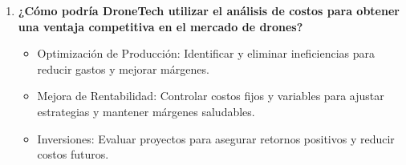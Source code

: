 \documentclass[letterpaper,12pt]{article}
\begin{document}
\begin{sloppypar}
\begin{enumerate}
    \item \textbf{¿Cómo podría DroneTech utilizar el análisis de costos para obtener una
    ventaja competitiva en el mercado de drones?}
    \begin{itemize}
        \item Optimización de Producción: Identificar y eliminar ineficiencias para reducir gastos y mejorar márgenes.
        \item Mejora de Rentabilidad: Controlar costos fijos y variables para ajustar estrategias y mantener márgenes saludables.
        \item Inversiones: Evaluar proyectos para asegurar retornos positivos y reducir costos futuros.
    \end{itemize}
\end{enumerate}

\end{sloppypar}
\end{document}
